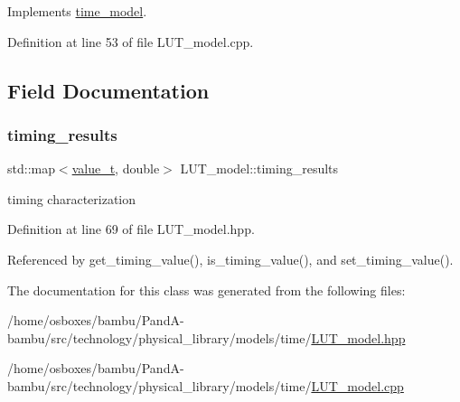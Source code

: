 Implements \hyperlink{classtime__model_a6f2a76cabb6407289e757cbdc155260d}{time\+\_\+model}.



Definition at line 53 of file L\+U\+T\+\_\+model.\+cpp.



\subsection{Field Documentation}
\mbox{\label{classLUT__model_aaa1328cce2f2b3c3a78dbf9ba2b2d879}} 
\subsubsection{\texorpdfstring{timing\+\_\+results}{timing\_results}}
{\footnotesize\ttfamily std\+::map$<$\hyperlink{classLUT__model_a863cc03b53b14df7344ada5a1bed2b20}{value\+\_\+t}, double$>$ L\+U\+T\+\_\+model\+::timing\+\_\+results\hspace{0.3cm}{\ttfamily [protected]}}



timing characterization 



Definition at line 69 of file L\+U\+T\+\_\+model.\+hpp.



Referenced by get\+\_\+timing\+\_\+value(), is\+\_\+timing\+\_\+value(), and set\+\_\+timing\+\_\+value().



The documentation for this class was generated from the following files\+:\begin{DoxyCompactItemize}
\item 
/home/osboxes/bambu/\+Pand\+A-\/bambu/src/technology/physical\+\_\+library/models/time/\hyperlink{LUT__model_8hpp}{L\+U\+T\+\_\+model.\+hpp}\item 
/home/osboxes/bambu/\+Pand\+A-\/bambu/src/technology/physical\+\_\+library/models/time/\hyperlink{LUT__model_8cpp}{L\+U\+T\+\_\+model.\+cpp}\end{DoxyCompactItemize}
